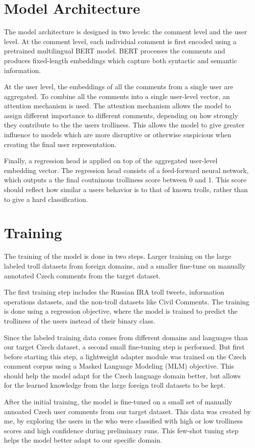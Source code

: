 \documentclass[twoside]{ctuthesis}
\theoremstyle{plain}
\theoremstyle{definition}
\theoremstyle{note}
\begin{document}
\section{Model Architecture}
The model architecture is designed in two levels: the comment level and the user level. At the comment level, each individual comment is first encoded using a pretrained multilingual BERT model. BERT processes the comments and produces fixed-length embeddings which capture both syntactic and semantic information.\par
At the user level, the embeddings of all the comments from a single user are aggregated. To combine all the comments into a single user-level vector, an attention mechanism is used. The attention mechanism allows the model to assign different importance to different comments, depending on how strongly they contribute to the the users trolliness. This allows the model to give greater influence to models which are more disruptive or otherwise suspicious when creating the final user representation.\par
Finally, a regression head is applied on top of the aggregated user-level embedding vector. The regression head consists of a feed-forward neural network, which outputs a the final coutninous trolliness score between 0 and 1. This score should reflect how similar a users behavior is to that of known trolls, rather than to give a hard classification.\par

\section{Training}
The training of the model is done in two steps. Larger training on the large labeled troll datasets from foreign domains, and a smaller fine-tune on manually annotated Czech comments from the target dataset.\par
The first training step includes the Russian IRA troll tweets, information operations datasets, and the non-troll datasets like Civil Comments. The training is done using a regression objective, where the model is trained to predict the trolliness of the users instead of their binary class.\par
Since the labeled training data comes from different domains and languages than our target Czech dataset, a second small fine-tuning step is performed. But first before starting this step, a lightweight adapter module was trained on the Czech comment corpus using a Masked Language Modeling (MLM) objective. This should help the model adapt for the Czech language domain better, but allows for the learned knowledge from the large foreign troll datasets to be kept.\par
After the initial training, the model is fine-tuned on a small set of manually annoated Czech user comments from our target dataset. This data was created by me, by exploring the users in the who were classified with high or low trolliness scores and high confidence during preliminary runs. This few-shot tuning step helps the model better adapt to our specific domain.\par
\end{document}
